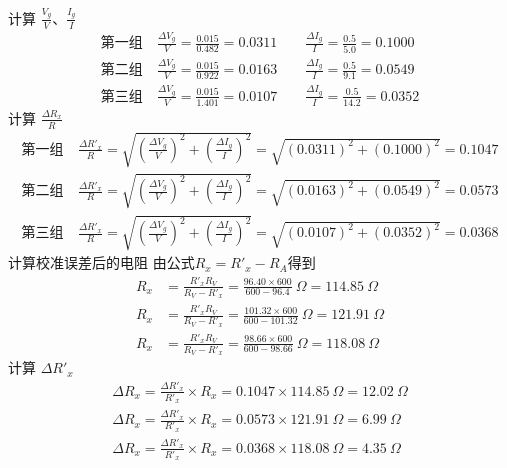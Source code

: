 \documentclass[UTF8]{ctexart}
\begin{document}
 计算 $\frac{V_g}{V}$、$\frac{I_g}{I}$
\begin{align*}
  \text{第一组}& \  \frac{\Delta V_g}{V} = \frac{0.015}{0.482} =0.0311 \qquad  \frac{\Delta I_g}{I}= \frac{0.5}{5.0}= 0.1000 \\
  \text{第二组}& \  \frac{\Delta V_g}{V} = \frac{0.015}{0.922} = 0.0163 \qquad  \frac{\Delta I_g}{I}= \frac{0.5}{9.1}= 0.0549 \\
  \text{第三组}& \  \frac{\Delta V_g}{V} = \frac{0.015}{1.401} = 0.0107 \qquad  \frac{\Delta I_g}{I}= \frac{0.5}{14.2}= 0.0352
\end{align*}
计算 $\frac{\Delta R_x}{R}$
\begin{align*}
  \text{第一组}& \  \frac{\Delta R'_x}{R} = \sqrt{(\frac{\Delta V_g}{V})^2 + (\frac{\Delta I_g}{I})^2} = \sqrt{(0.0311)^2 + (0.1000)^2} = 0.1047  \\
  \text{第二组}& \  \frac{\Delta R'_x}{R} = \sqrt{(\frac{\Delta V_g}{V})^2 + (\frac{\Delta I_g}{I})^2} = \sqrt{(0.0163)^2 + (0.0549)^2} = 0.0573\\
  \text{第三组}& \  \frac{\Delta R'_x}{R} = \sqrt{(\frac{\Delta V_g}{V})^2 + (\frac{\Delta I_g}{I})^2} = \sqrt{(0.0107)^2 + (0.0352)^2} = 0.0368
\end{align*}
计算校准误差后的电阻 由公式$R_x = R'_x - R_A$得到
\begin{align*}
   R_x &= \frac{R'_xR_V}{R_V - R'_x}   = \frac{96.40\times600}{600 - 96.4} \ \Omega = 114.85 \ \Omega \\
    R_x &= \frac{R'_xR_V}{R_V - R'_x}  = \frac{101.32\times600}{600 - 101.32} \ \Omega = 121.91 \ \Omega \\
    R_x &= \frac{R'_xR_V}{R_V - R'_x}  = \frac{98.66\times600}{600 - 98.66} \ \Omega = 118.08 \ \Omega 
\end{align*}
计算 $\Delta R'_x$
\begin{align*}
    \Delta R_x = \frac{\Delta R'_x}{R'_x} \times R_x = 0.1047 \times 114.85 \ \Omega = 12.02 \ \Omega \\
    \Delta R_x = \frac{\Delta R'_x}{R'_x} \times R_x = 0.0573 \times 121.91 \ \Omega = 6.99 \ \Omega \\
    \Delta R_x = \frac{\Delta R'_x}{R'_x} \times R_x = 0.0368 \times 118.08 \ \Omega = 4.35 \ \Omega 
\end{align*}
\end{document}
